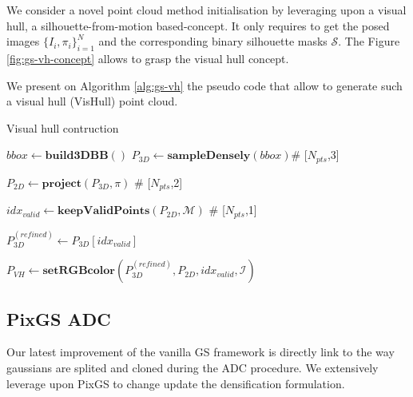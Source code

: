 We consider a novel point cloud method initialisation by leveraging upon a visual hull, a silhouette-from-motion \citep{baumgart1974geometric} based-concept. It only requires to get the posed images $\{I_{i},\pi_{i}\}_{i=1}^{N}$ and the corresponding binary silhouette masks $\mathcal{S}$. The Figure \ref{fig:gs-vh-concept} allows to grasp the visual hull concept. 

We present on Algorithm \ref{alg:gs-vh} the pseudo code that allow to generate such a visual hull (VisHull) point cloud. 

\begin{algorithm}[htpb!]
  \caption{Visual hull contruction}\label{alg:gs-vh}
  \medskip
  \medskip
  $bbox \gets \mathbf{build3DBB}()$ 
  $P_{3D} \gets \mathbf{sampleDensely}(bbox)$\hspace{.4cm}\textcolor{gray!80}{\# 
    [$N_{pts}$,3]} 

   $P_{2D} \gets \mathbf{project}(P_{3D},\pi)$ \hspace{.4cm}\textcolor{gray!80}{\# 
    [$N_{pts}$,2]} 
    
    $idx_{valid} \gets \mathbf{keepValidPoints}(P_{2D},\mathcal{M})$ \hspace{.4cm}\textcolor{gray!80}{\# 
    [$N_{pts}$,1]} 

    $P_{3D}^{(refined)} \gets P_{3D}[idx_{valid}]$ 

    $P_{VH} \gets \mathbf{setRGBcolor}(P_{3D}^{(refined)},P_{2D},idx_{valid},\mathcal{I})$ 
\end{algorithm}

\subsection{PixGS ADC}
\label{gs:pixgs-adc}
Our latest improvement of the vanilla GS framework is directly link to the way gaussians are splited and cloned during the \ac{ADC} procedure. We extensively leverage upon PixGS \citep{zhang2024pixelgs} to change update the densification formulation.  

